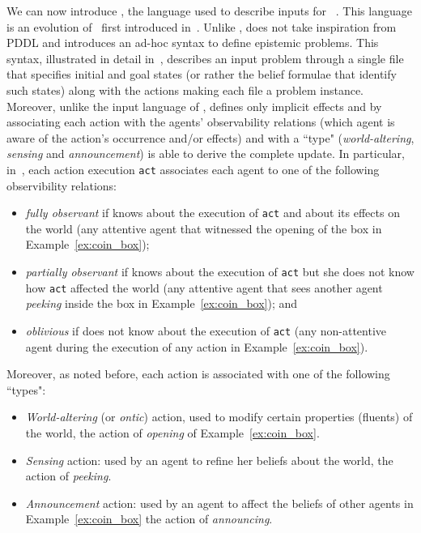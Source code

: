 %
%
%
\mypar{\mar} We can now introduce \mar, the language used to describe inputs for \EFP~\cite{Fab20}.
This language is an evolution of \mAP\ first introduced in~\cite{baral2015action}.
Unlike \pdkbpddl, \mar does not take inspiration from PDDL and introduces an ad-hoc syntax to define epistemic problems.
This syntax, illustrated in detail in~\cite{baral2015action,cilc19Epistemic}, describes an input problem through a single file that specifies initial and goal states (or rather the belief formulae that identify such states) along with the actions making each file a problem instance.
Moreover, unlike the input language of \rpmep, \mar defines only implicit effects and by associating each action with the agents' observability relations (which agent is aware of the action's occurrence and/or effects) and with a ``type" (\textit{world-altering}, \textit{sensing} and \textit{announcement}) is able to derive the complete \knobel update.
In particular, in~\cite{baral2015action}, each action execution \texttt{act} associates each agent   to one of the following observibility relations:
\begin{itemize}
	\item \emph{fully observant} if  knows about the execution of \texttt{act} and about its effects on the world (\eg any attentive agent that witnessed the opening of the box in Example~\ref{ex:coin_box});
	\item \emph{partially observant} if  knows about the execution of \texttt{act} but she does not know how \texttt{act} affected the world (\eg any attentive agent that sees another agent \emph{peeking} inside the box in Example~\ref{ex:coin_box}); and
	\item \emph{oblivious} if  does not know about the execution of \texttt{act} (\eg any non-attentive agent during the execution of any action in Example~\ref{ex:coin_box}).
\end{itemize}
Moreover, as noted before, each action is associated with one of the following ``types":
\begin{itemize}
 \item \emph{World-altering} (or \emph{ontic}) action, used to modify certain properties (\ie fluents) of the world, \eg
	the action of \emph{opening} of Example~\ref{ex:coin_box}.
	\item \emph{Sensing} action: used by an agent to refine her beliefs about the world, \eg
	the action of \emph{peeking}.
	\item \emph{Announcement} action: used by an agent to affect the beliefs of other
	agents \eg in Example~\ref{ex:coin_box} the action of \emph{announcing}.
\end{itemize}
